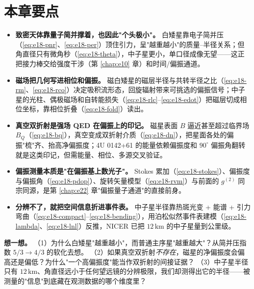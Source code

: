 \section{本章要点}
\label{sec:e18-summary}

\begin{itemize}
\item \textbf{致密天体靠量子简并撑着，也因此"个头极小"。} 白矮星靠电子简并压（\eqref{eq:e18-pnr}、\eqref{eq:e18-per}）顶住引力，呈"越重越小"的质量–半径关系；但角直径只有微角秒（\eqref{eq:e18-theta}），中子星更小，单口径成像无望——这正把接力棒交给强度干涉（第 \ref{chap:e10} 章）和时间/偏振通道。
\item \textbf{磁场把几何写进相位和偏振。} 磁白矮星的磁层半径与共转半径之比（\eqref{eq:e18-rm}、\eqref{eq:e18-rco}）决定吸积流形态，回旋辐射带来可挑选的偏振信号；中子星的光柱、偶极磁场和自转能损失（\eqref{eq:e18-rlc}–\eqref{eq:e18-edot}）把磁层切成相位坐标，靠相位折叠（\eqref{eq:e18-fold}）读出。
\item \textbf{真空双折射是强场 QED 在偏振上的印记。} 磁星表面 \(B\) 逼近甚至超过临界场 \(B_Q\)（\eqref{eq:e18-bq}），真空变成双折射介质（\eqref{eq:e18-dn}），把星面各处的偏振"梳"齐、抬高净偏振度；4U 0142+61 的能量依赖偏振度和 \(90^\circ\) 偏振角翻转就是这类印记，但需能量、相位、多源交叉验证。
\item \textbf{偏振测量本质是"在偏振基上数光子"。} Stokes 累加（\eqref{eq:e18-stokes}）、偏振度与偏振角（\eqref{eq:e18-pdop}）、旋转矢量模型（\eqref{eq:e18-rvm}）与前面的 \(g^{(2)}\) 同宗同源，是第 \ref{chap:e22} 章"偏振量子通道"的直接前身。
\item \textbf{分辨不了，就把空间信息折进事件表。} 中子星半径靠热斑光变 + 能谱 + 引力弯曲（\eqref{eq:e18-compact}–\eqref{eq:e18-bending}），用泊松似然事件表建模（\eqref{eq:e18-lambda}、\eqref{eq:e18-lnl}）反推，NICER 已把 \(12\,\mathrm{km}\) 的中子星量到公里级。
\end{itemize}

\noindent\textbf{想一想。}
（1）为什么白矮星"越重越小"，而普通主序星"越重越大"？从简并压指数 \(5/3\to4/3\) 的软化去想。
（2）如果真空双折射\emph{不存在}，磁星的净偏振度会偏高还是偏低？为什么"一个高偏振度"能当作双折射的间接证据？
（3）中子星半径只有 \(12\,\mathrm{km}\)、角直径远小于任何望远镜的分辨极限，我们却测得出它的半径——被测量的"信息"到底藏在观测数据的哪个维度里？
